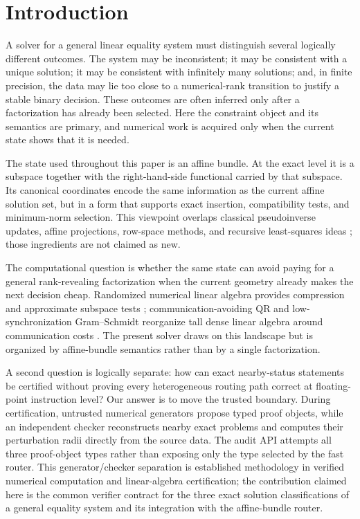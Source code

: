 \documentclass[11pt]{article}
\theoremstyle{definition}
\begin{document}
\section{Introduction}
A solver for a general linear equality system must distinguish several logically different outcomes. The system may be inconsistent; it may be consistent with a unique solution; it may be consistent with infinitely many solutions; and, in finite precision, the data may lie too close to a numerical-rank transition to justify a stable binary decision. These outcomes are often inferred only after a factorization has already been selected. Here the constraint object and its semantics are primary, and numerical work is acquired only when the current state shows that it is needed.

The state used throughout this paper is an affine bundle. At the exact level it is a subspace together with the right-hand-side functional carried by that subspace. Its canonical coordinates encode the same information as the current affine solution set, but in a form that supports exact insertion, compatibility tests, and minimum-norm selection. This viewpoint overlaps classical pseudoinverse updates, affine projections, row-space methods, and recursive least-squares ideas \citep{Greville1960,BenIsraelGreville2003,Plesnik2007}; those ingredients are not claimed as new.

The computational question is whether the same state can avoid paying for a general rank-revealing factorization when the current geometry already makes the next decision cheap. Randomized numerical linear algebra provides compression and approximate subspace tests \citep{ClarksonWoodruff2013,NelsonNguyen2013,GowerRichtarik2015}; communication-avoiding QR and low-synchronization Gram--Schmidt reorganize tall dense linear algebra around communication costs \citep{DemmelEtAl2008,CarsonLundMaOktay2024,CarsonMa2024}. The present solver draws on this landscape but is organized by affine-bundle semantics rather than by a single factorization.

A second question is logically separate: how can exact nearby-status statements be certified without proving every heterogeneous routing path correct at floating-point instruction level? Our answer is to move the trusted boundary. During certification, untrusted numerical generators propose typed proof objects, while an independent checker reconstructs nearby exact problems and computes their perturbation radii directly from the source data. The audit API attempts all three proof-object types rather than exposing only the type selected by the fast router. This generator/checker separation is established methodology in verified numerical computation and linear-algebra certification; the contribution claimed here is the common verifier contract for the three exact solution classifications of a general equality system and its integration with the affine-bundle router.
\end{document}
